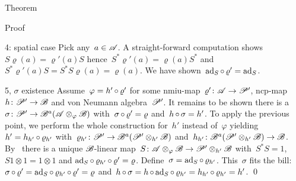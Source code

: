 \documentclass[b]{subfiles}
\begin{document}
\begin{parsec}
\begin{point}{Theorem}
\begin{point}{Proof}
\begin{point}{4: spatial case}
Pick any~$a \in \mathscr{A}$.
A straight-forward computation shows~$S \varrho(a) = \varrho'(a) S$
hence~$S^* \varrho'(a) = \varrho(a) S^*$
and~$S^* \varrho'(a) S = S^*S \varrho(a) = \varrho(a)$.
We have shown~$\mathrm{ad}_S \mathop{\circ} \varrho' = \mathrm{ad}_S$.
\end{point}
\begin{point}{5, $\sigma$ existence}
Assume~$\varphi = h' \mathop{\circ} \varrho'$
    for some nmiu-map~$\varrho'\colon \mathscr{A} \to \mathscr{P}'$,
        ncp-map~$h\colon \mathscr{P}' \to \mathscr{B}$
        and von Neumann algebra~$\mathscr{P}'$.
It remains to be shown there is a ~$\sigma\colon \mathscr{P}' \to \mathscr{B}^a(\mathscr{A}\otimes_\varphi\mathscr{B})$
with~$\sigma\mathop{\circ}\varrho'=\varrho$ and~$h \mathop{\circ} \sigma = h'$.
To apply the previous point,
    we perform the whole construction for~$h'$ instead of~$\varphi$
    yielding
    $h' = h_{h'} \mathop{\circ} \varrho_{h'}$
    with~$\varrho_{h'} \colon \mathscr{P}' \to \mathscr{B}^a (\mathscr{P}' \otimes_{h'} \mathscr{B})$
    and~$h_{h'} \colon \mathscr{B}^a(\mathscr{P}' \otimes_{h'} \mathscr{B}) \to \mathscr{B}$.
By~
    there is a unique 
    $\mathscr{B}$-linear map~$S\colon \mathscr{A} \otimes_{\varphi} \mathscr{B} \to
                                \mathscr{P}' \otimes_{h'} \mathscr{B}$
with~$S^*S = 1$, $S 1\otimes1 = 1\otimes1$ and
$\mathrm{ad}_S \mathop{\circ} \varrho_{h'}\mathop{\circ} \varrho' = \varrho$.
Define~$\sigma = \mathrm{ad}_S \mathop{\circ} \varrho_{h'}$.
This~$\sigma$ fits the bill:
$\sigma \mathop{\circ} \varrho' = \mathrm{ad}_S \mathop{\circ} \varrho_{h'} \mathop{\circ} \varrho'
                                = \varrho$
and~$h \mathop{\circ} \sigma = h \mathop{\circ} \mathrm{ad}_S \mathop{\circ} \varrho_{h'}
= h_{h'} \mathop{\circ} \varrho_{h'} = h'$. \qed
\end{point}
\end{point}
\end{point}
\end{parsec}
\end{document}
